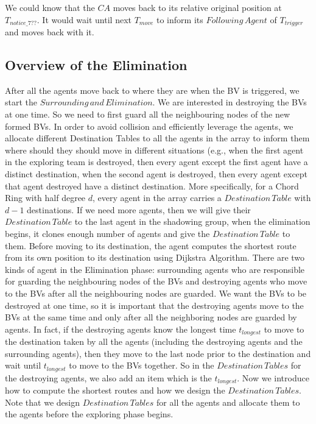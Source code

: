 We could know that the $CA$ moves back to its relative original position at $T_{notice\_7??}$. It would wait until next $T_{move}$ to inform its $Following\,Agent$ of $T_{trigger}$ and moves back with it.

\subsection{Overview of the Elimination}
After all the agents move back to where they are when the BV is triggered, we start the $Surrounding\,and\,Elimination$. We are interested in destroying the BVs at one time. So we need to first guard all the neighbouring nodes of the new formed BVs. In order to avoid collision and efficiently leverage the agents, we allocate different Destination Tables to all the agents in the array to inform them where should they should move in different situations (e.g., when the first agent in the exploring team is destroyed, then every agent except the first agent have a distinct destination, when the second agent is destroyed, then every agent except that agent destroyed have a distinct destination. More specifically, for a Chord Ring with half degree $d$, every agent in the array carries a $Destination\,Table$ with $d-1$ destinations. If we need more agents, then we will give their $Destination\,Table$ to the last agent in the shadowing group, when the elimination begins, it clones enough number of agents and give the $Destination\, Table$ to them. Before moving to its destination, the agent computes the shortest route from its own position to its destination using Dijkstra Algorithm. There are two kinds of agent in the Elimination phase: surrounding agents who are responsible for guarding the neighbouring nodes of the BVs and destroying agents who move to the BVs after all the neighbouring nodes are guarded. We want the BVs to be destroyed at one time, so it is important that the destroying agents move to the BVs at the same time and only after all the neighboring nodes are guarded by agents. In fact, if the destroying agents know the longest time $t_{longest}$ to move to the destination taken by all the agents (including the destroying agents and the surrounding agents), then they move to the last node prior to the destination and wait until $t_{longest}$ to move to the BVs together. So in the $Destination\,Tables$ for the destroying agents, we also add an item which is the $t_{longest}$. Now we introduce how to compute the shortest routes and how we design the $Destination\,Tables$. Note that we design $Destination\,Tables$ for all the agents and allocate them to the agents before the exploring phase begins.

